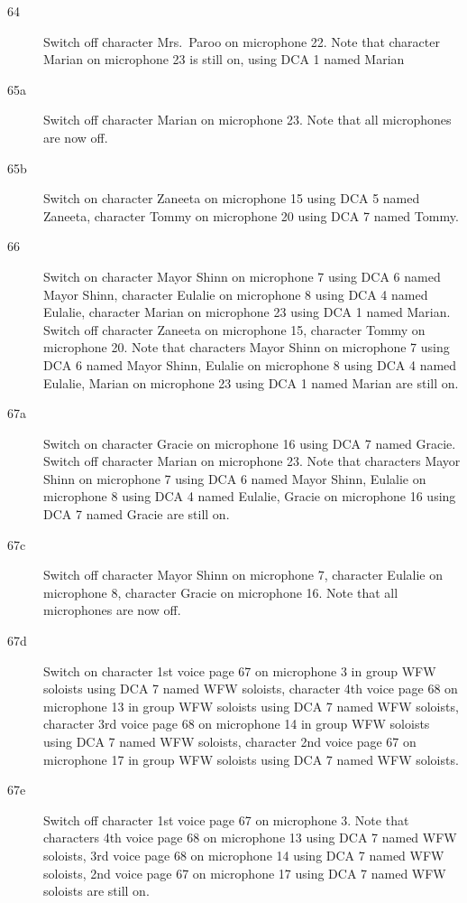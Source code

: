 \begin{description}
\item[64]
Switch off character Mrs.~Paroo on microphone 22. Note that character Marian on microphone 23 is still on, using DCA 1 named Marian

\item[65a]
Switch off character Marian on microphone 23. Note that all microphones are now off.

\item[65b]
Switch on character Zaneeta on microphone 15 using DCA 5 named Zaneeta, character Tommy on microphone 20 using DCA 7 named Tommy. 

\item[66]
Switch on character Mayor Shinn on microphone 7 using DCA 6 named Mayor Shinn, character Eulalie on microphone 8 using DCA 4 named Eulalie, character Marian on microphone 23 using DCA 1 named Marian. Switch off character Zaneeta on microphone 15, character Tommy on microphone 20. Note that characters Mayor Shinn on microphone 7 using DCA 6 named Mayor Shinn, Eulalie on microphone 8 using DCA 4 named Eulalie, Marian on microphone 23 using DCA 1 named Marian are still on.  

\item[67a]
Switch on character Gracie on microphone 16 using DCA 7 named Gracie. Switch off character Marian on microphone 23. Note that characters Mayor Shinn on microphone 7 using DCA 6 named Mayor Shinn, Eulalie on microphone 8 using DCA 4 named Eulalie, Gracie on microphone 16 using DCA 7 named Gracie are still on.  

\item[67c]
Switch off character Mayor Shinn on microphone 7, character Eulalie on microphone 8, character Gracie on microphone 16. Note that all microphones are now off.

\item[67d]
Switch on character 1st voice page 67 on microphone 3 in group WFW soloists using DCA 7 named WFW soloists, character 4th voice page 68 on microphone 13 in group WFW soloists using DCA 7 named WFW soloists, character 3rd voice page 68 on microphone 14 in group WFW soloists using DCA 7 named WFW soloists, character 2nd voice page 67 on microphone 17 in group WFW soloists using DCA 7 named WFW soloists. 

\item[67e]
Switch off character 1st voice page 67 on microphone 3. Note that characters 4th voice page 68 on microphone 13 using DCA 7 named WFW soloists, 3rd voice page 68 on microphone 14 using DCA 7 named WFW soloists, 2nd voice page 67 on microphone 17 using DCA 7 named WFW soloists are still on.  


\end{description}
